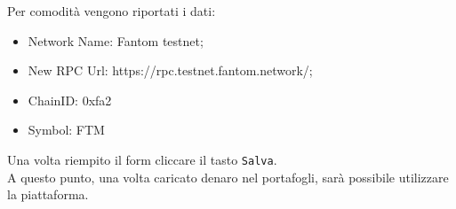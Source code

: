 Per comodità vengono riportati i dati:

\begin{itemize}
    \item Network Name: Fantom testnet;
    \item New RPC Url: https://rpc.testnet.fantom.network/;
    \item ChainID: 0xfa2
    \item Symbol: FTM
\end{itemize}

Una volta riempito il form cliccare il tasto \texttt{Salva}.\\

A questo punto, una volta caricato denaro nel portafogli, sarà possibile utilizzare la piattaforma.
